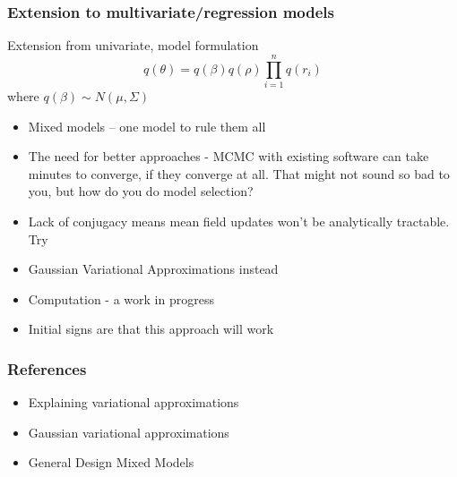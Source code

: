 \documentclass{beamer}
\begin{document}
\begin{frame}
\frametitle{Extension to multivariate/regression models}
Extension from univariate, model formulation
$$
q(\theta) = q(\beta) q(\rho) \prod_{i=1}^n q(r_i)
$$
where
$q(\beta) \sim N(\mu, \Sigma)$

\begin{itemize}
\item Mixed models -- one model to rule them all
\item The need for better approaches - MCMC with existing software can take minutes to
converge, if they converge at all. That might not sound so bad to you, but how do you
do model selection?
\end{itemize}
\end{frame}

\begin{frame}
\begin{itemize}
\item Lack of conjugacy means mean field updates won't be analytically tractable. Try
\item Gaussian Variational Approximations instead
\item Computation - a work in progress
\item Initial signs are that this approach will work
\end{itemize}
\end{frame}

\begin{frame}
\frametitle{References}
\begin{itemize}
\item Explaining variational approximations
\item Gaussian variational approximations
\item General Design Mixed Models
\end{itemize}
\end{frame}
\end{document}
